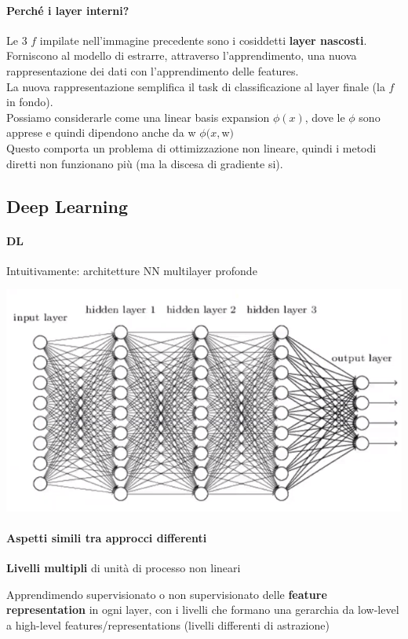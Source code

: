 \documentclass[10pt]{book}
\begin{document}
\paragraph{Perché i layer interni?} Le 3 $f$ impilate nell'immagine precedente sono i cosiddetti \textbf{layer nascosti}.\\
Forniscono al modello di estrarre, attraverso l'apprendimento, una nuova rappresentazione dei dati con l'apprendimento delle features.\\
La nuova rappresentazione semplifica il task di classificazione al layer finale (la $f$ in fondo).\\
Possiamo considerarle come una linear basis expansion $\phi(x)$, dove le $\phi$ sono apprese e quindi dipendono anche da w $\phi(x,$w$)$\\
Questo comporta un problema di ottimizzazione non lineare, quindi i metodi diretti non funzionano più (ma la discesa di gradiente si).
\pagebreak
\subsection{Deep Learning}
\paragraph{DL} Intuitivamente: architetture NN multilayer profonde
\begin{center}
	\includegraphics[scale=0.7]{dl.png}
\end{center}
\paragraph{Aspetti simili tra approcci differenti}
\begin{list}{}{}
	\item \textbf{Livelli multipli} di unità di processo non lineari
	\item Apprendimendo supervisionato o non supervisionato delle \textbf{feature representation} in ogni layer, con i livelli che formano una gerarchia da low-level a high-level features/representations (livelli differenti di astrazione)
\end{list}
\end{document}
